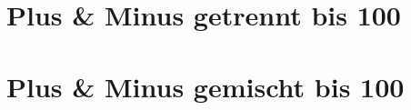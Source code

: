 \documentclass[version=last,paper=A4,fontsize=14pt,DIV=18]{scrartcl}
\begin{document}
	\section*{Plus \& Minus getrennt bis 100}
	
	
	
	
	\pagebreak
	
	\section*{Plus \& Minus gemischt bis 100}

	
	
\end{document}
